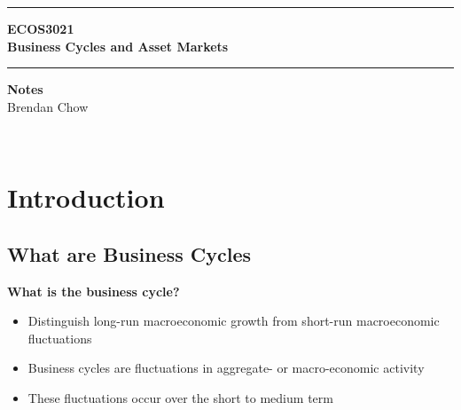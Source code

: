 \documentclass[a4paper,twoside]{article}
\newif\IfInSansMode
\numberwithin{equation}{section}
\numberwithin{figure}{section}
\begin{document}
\begin{titlepage}
	\centering
	\vspace*{4.5cm}
	\rule{\linewidth}{2pt}
	\LARGE\textbf{ECOS3021}\\
	\vspace{0.5cm}
	\Huge\textbf{Business Cycles and Asset Markets}\\
	\rule{\linewidth}{2pt}
	\LARGE\textbf{Notes}\\
	\vspace{1.5cm}
	\Large Brendan Chow
	\vfill
\end{titlepage}
	\newpage
	\
	\newpage
	\tableofcontents
	\newpage
{}
\section{Introduction}\label{Sec:1}
\subsection{What are Business Cycles}
	\textbf{What is the business cycle?}
	\begin{itemize}
		\item Distinguish \textcolor{myred}{long-run} macroeconomic \textcolor{myred}{growth} from \textcolor{myblue}{short-run} macroeconomic \textcolor{myblue}{fluctuations}
		\item Business cycles are \textcolor{myblue}{fluctuations} in aggregate- or macro-economic activity
		\item These fluctuations occur over the \textcolor{myblue}{short to medium} term
	\end{itemize}
\end{document}
